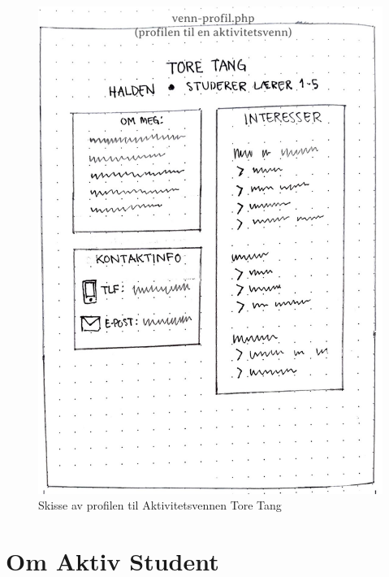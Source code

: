 \begin{figure}[H]
\centering
\includegraphics[width=.9\textwidth]{Illustrasjoner/Skisser-pdf/1.0/1-20-aktivitetsvenn-profil.pdf}
\caption{Skisse av profilen til Aktivitetsvennen Tore Tang}
\label{vedlegg:1-20-aktivitetsvennprofil}
\end{figure}

\section{Om Aktiv Student}


